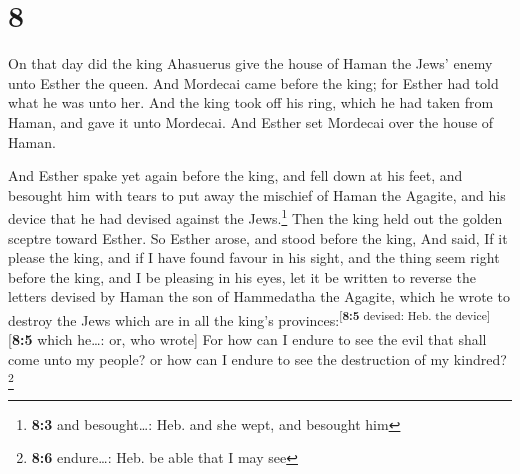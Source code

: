 \hypertarget{section-7}{%
\section{8}\label{section-7}}

 On that day did the king Ahasuerus give the house of
Haman the Jews' enemy unto Esther the queen. And Mordecai came before
the king; for Esther had told what he was unto her.  And
the king took off his ring, which he had taken from Haman, and gave it
unto Mordecai. And Esther set Mordecai over the house of Haman.

 And Esther spake yet again before the king, and fell down
at his feet, and besought him with tears to put away the mischief of
Haman the Agagite, and his device that he had devised against the
Jews.\footnote{\textbf{8:3} and besought\ldots: Heb. and she wept, and
  besought him}  Then the king held out the golden sceptre
toward Esther. So Esther arose, and stood before the king,
 And said, If it please the king, and if I have found
favour in his sight, and the thing seem right before the king, and I be
pleasing in his eyes, let it be written to reverse the letters devised
by Haman the son of Hammedatha the Agagite, which he wrote to destroy
the Jews which are in all the king's
provinces:\textsuperscript{{[}\textbf{8:5} devised: Heb. the
device{]}}{[}\textbf{8:5} which he\ldots: or, who wrote{]}
 For how can I endure to see the evil that shall come unto
my people? or how can I endure to see the destruction of my
kindred?\footnote{\textbf{8:6} endure\ldots: Heb. be able that I may see}


